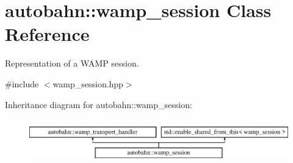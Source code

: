 \hypertarget{classautobahn_1_1wamp__session}{}\section{autobahn\+:\+:wamp\+\_\+session Class Reference}
\label{classautobahn_1_1wamp__session}


Representation of a W\+A\+MP session.  




{\ttfamily \#include $<$wamp\+\_\+session.\+hpp$>$}

Inheritance diagram for autobahn\+:\+:wamp\+\_\+session\+:\begin{figure}[H]
\begin{center}
\leavevmode
\includegraphics[height=1.937716cm]{classautobahn_1_1wamp__session}
\end{center}
\end{figure}
